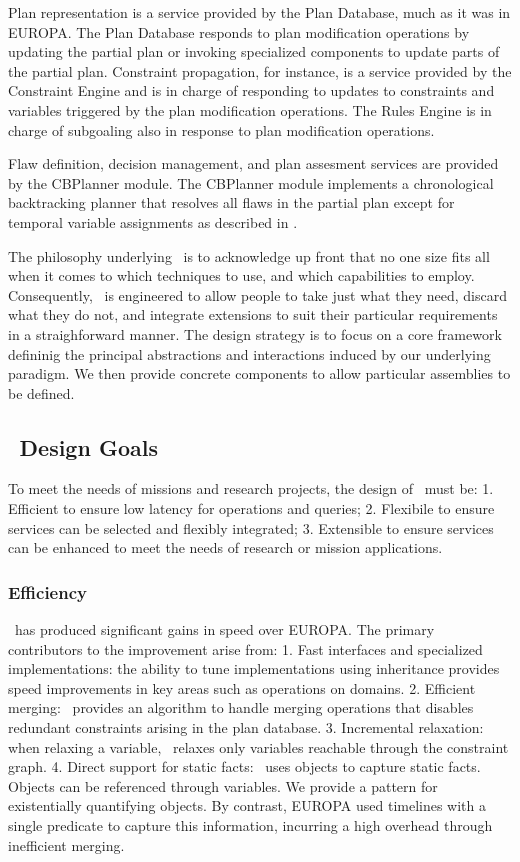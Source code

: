 \documentclass[10pt, letterpaper, twoside]{article}
\begin{document}
Plan representation is a service provided by the Plan Database, much as it
was in EUROPA.  The Plan Database responds to plan modification operations
by updating the partial plan or invoking specialized components to update
parts of the partial plan.  Constraint propagation, for instance, is a
service provided by the Constraint Engine and is in charge of responding to
updates to constraints and variables triggered by the plan modification
operations. The Rules Engine is in charge of subgoaling also in response to
plan modification operations. 

Flaw definition, decision management, and plan assesment services are
provided by the CBPlanner module. The CBPlanner module implements a
chronological backtracking planner that resolves all flaws in the partial
plan except for temporal variable assignments as described in
\cite{planid,e2}. 

The philosophy underlying \ET\, is to acknowledge up front that no
one size fits all when it comes to which techniques to use, and which
capabilities to employ. Consequently, \ET\, is engineered to allow
people to take just what they need, discard what they do not, and
integrate extensions to suit their particular requirements in a
straighforward manner. The design strategy is to focus on a core
framework defininig the principal abstractions and interactions
induced by our underlying paradigm. We then provide concrete
components to allow particular assemblies to be defined. 

\subsection{\ET\, Design Goals}
To meet the needs of missions and research projects, the design of 
\ET\, must be: 1. Efficient to ensure low latency for operations and
queries; 2. Flexibile to ensure services can be selected and flexibly
integrated; 3. Extensible to ensure services can be enhanced to meet the
needs of research or mission applications. 

\subsubsection{Efficiency} \ET\, has produced significant gains in speed over
EUROPA. The primary contributors to the improvement arise from: 1. Fast
interfaces and specialized implementations: the ability to tune
implementations using inheritance provides speed improvements in key areas
such as operations on domains.  2. Efficient merging: \ET\, provides an
algorithm to handle merging operations that disables redundant constraints
arising in the plan database. 3. Incremental relaxation: when relaxing a
variable, \ET\, relaxes only variables reachable through the constraint graph.
4. Direct support for static facts: \ET\, uses objects to capture static
facts. Objects can be referenced through variables.  We provide a pattern
for existentially quantifying objects. By contrast, EUROPA used
timelines with a single predicate to capture this information, incurring a
high overhead through inefficient merging. 
\end{document}
